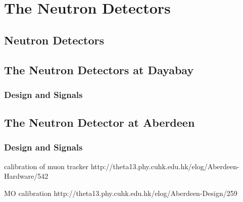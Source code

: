 
\chapter{The Neutron Detectors}

\section{Neutron Detectors}

\section{The Neutron Detectors at Dayabay}

\subsection{Design and Signals}

\section{The Neutron Detector at Aberdeen}

\subsection{Design and Signals}

calibration of muon tracker
http://theta13.phy.cuhk.edu.hk/elog/Aberdeen-Hardware/542

MO calibration
http://theta13.phy.cuhk.edu.hk/elog/Aberdeen-Design/259



